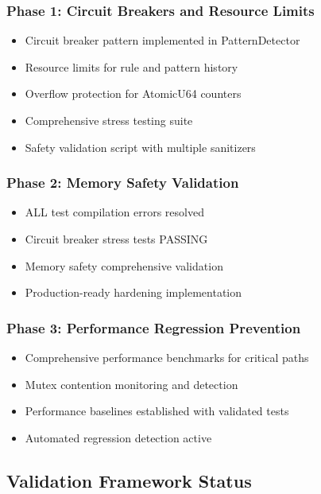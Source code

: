 \documentclass[11pt,a4paper]{article}
\newcommand{\success}[1]{\textcolor{successgreen}{\textbf{#1}}}
\begin{document}
\subsubsection{Phase 1: Circuit Breakers and Resource Limits}
\begin{itemize}[label=\success{$\checkmark$}]
    \item Circuit breaker pattern implemented in PatternDetector
    \item Resource limits for rule and pattern history
    \item Overflow protection for AtomicU64 counters
    \item Comprehensive stress testing suite
    \item Safety validation script with multiple sanitizers
\end{itemize}

\subsubsection{Phase 2: Memory Safety Validation}
\begin{itemize}[label=\success{$\checkmark$}]
    \item ALL test compilation errors resolved
    \item Circuit breaker stress tests PASSING
    \item Memory safety comprehensive validation
    \item Production-ready hardening implementation
\end{itemize}

\subsubsection{Phase 3: Performance Regression Prevention}
\begin{itemize}[label=\success{$\checkmark$}]
    \item Comprehensive performance benchmarks for critical paths
    \item Mutex contention monitoring and detection
    \item Performance baselines established with validated tests
    \item Automated regression detection active
\end{itemize}

\subsection{Validation Framework Status}
\end{document}
